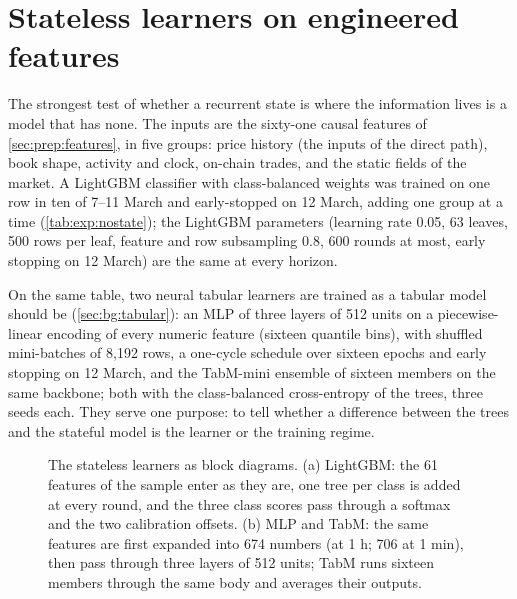 \section{Stateless learners on engineered features}
\label{sec:models:stateless}

The strongest test of whether a recurrent state is where the information lives is a model
that has none.  The inputs are the sixty-one causal features of \cref{sec:prep:features},
in five groups: price history (the inputs of the direct path), book shape, activity and
clock, on-chain trades, and the static fields of the market.  A LightGBM classifier
\cite{ke2017lightgbm} with class-balanced weights was trained on one row in ten of
7--11 March and early-stopped on 12 March, adding one group at a time
(\cref{tab:exp:nostate}); the LightGBM parameters (learning rate 0.05, 63 leaves, 500
rows per leaf, feature and row subsampling 0.8, 600 rounds at most, early stopping on
12 March) are the same at every horizon.

On the same table, two neural tabular learners are trained as a tabular model should be
(\cref{sec:bg:tabular}): an MLP of three layers of 512 units on a piecewise-linear encoding
of every numeric feature (sixteen quantile bins), with shuffled mini-batches of 8{,}192 rows,
a one-cycle schedule over sixteen epochs and early stopping on 12 March, and the TabM-mini
ensemble of sixteen members on the same backbone; both with the class-balanced
cross-entropy of the trees, three seeds each.  They serve one purpose: to tell whether a
difference between the trees and the stateful model is the learner or the training regime.

\begin{figure}[t]
\centering
\resizebox{\textwidth}{!}{}
\caption{The stateless learners as block diagrams.  (a) LightGBM: the 61 features of the
sample enter as they are, one tree per class is added at every round, and the three
class scores pass through a softmax and the two calibration offsets.  (b) MLP and TabM:
the same features are first expanded into 674 numbers (at 1 h; 706 at 1 min), then pass
through three layers of 512 units; TabM runs sixteen members through the same body and
averages their outputs.}
\label{fig:models:stateless}
\end{figure}

